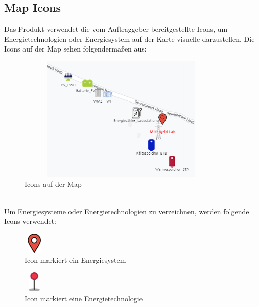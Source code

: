 \subsection{Map Icons}\label{sec: Map Icons}
Das Produkt verwendet die vom Auftraggeber bereitgestellte Icons, um Energietechnologien oder Energiesystem auf der Karte visuelle darzustellen. Die Icons auf der Map sehen folgendermaßen aus:
\begin{figure}[h]
	\centering
	\includegraphics[height=6cm,width=10cm]{images/MapIcons}
	\caption{Icons auf der Map}
	\label{fig: Icons auf der Map}
\end{figure}
\\
Um Energiesysteme oder Energietechnologien zu verzeichnen, werden folgende Icons verwendet: 
\begin{figure}[h]
	\centering
	\includegraphics[height=1cm,width=1cm]{images/Icons/esrot}
	\caption{Icon markiert ein Energiesystem}
	\label{fig: EnergiesystemIcon}
\end{figure}
\begin{figure}[h]
	\centering
	\includegraphics[height=1cm,width=1cm]{images/Icons/etrot}
	\caption{Icon markiert eine Energietechnologie}
	\label{fig: EnergietechnologieIcon}
\end{figure}

\newpage


